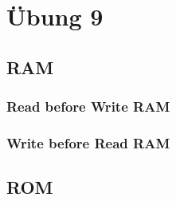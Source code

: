 \section{Übung 9}
\subsection{RAM}
\subsubsection{Read before Write RAM}
%
\subsubsection{Write before Read RAM}

\subsection{ROM}
